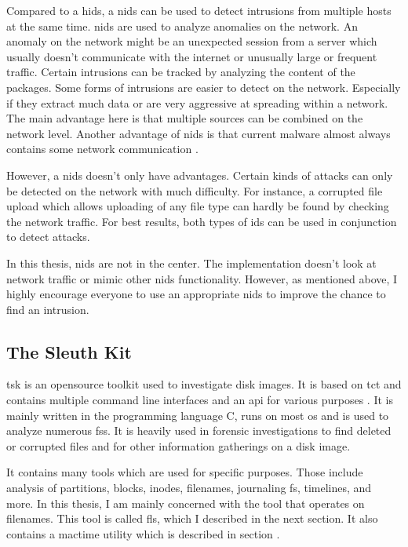 Compared to a \gls{hids}, a \gls{nids} can be used to detect \glspl{intrusion} from multiple hosts at the same time. \gls{nids} are used to analyze anomalies on the network. An \gls{anomaly} on the network might be an unexpected session from a server which usually doesn't communicate with the internet or unusually large or frequent traffic. Certain \glspl{intrusion} can be tracked by analyzing the content of the packages. Some forms of \glspl{intrusion} are easier to detect on the network. Especially if they extract much data or are very aggressive at spreading within a network. The main advantage here is that multiple sources can be combined on the network level. Another advantage of \gls{nids} is that current \gls{malware} almost always contains some network communication \cite{Malware:Behaviour,nids}.

However, a \gls{nids} doesn't only have advantages. Certain kinds of attacks can only be detected on the network with much difficulty. For instance, a corrupted file upload which allows uploading of any file type can hardly be found by checking the network traffic. For best results, both types of \gls{ids} can be used in conjunction to detect attacks. 

In this thesis, \gls{nids} are not in the center. The implementation doesn't look at network traffic or mimic other \gls{nids} functionality. However, as mentioned above, I highly encourage everyone to use an appropriate \gls{nids} to improve the chance to find an \gls{intrusion}. 

\subsection{The Sleuth Kit}
\label{sec:tsk}

\gls{tsk} is an \gls{opensource} toolkit used to investigate disk images. It is based on \gls{tct} \cite{tct} and contains multiple command line interfaces and an \gls{api} for various purposes \cite{tsk, tsk:about}. It is mainly written in the programming language C, runs on most \gls{os} and is used to analyze numerous \glspl{fs}. It is heavily used in forensic investigations to find deleted or corrupted files and for other information gatherings on a disk image.

It contains many tools which are used for specific purposes. Those include analysis of partitions, blocks, inodes, filenames, journaling \gls{fs}, timelines, and more. In this thesis, I am mainly concerned with the tool that operates on filenames. This tool is called fls, which I described in the next section. It also contains a mactime utility which is described in section .

